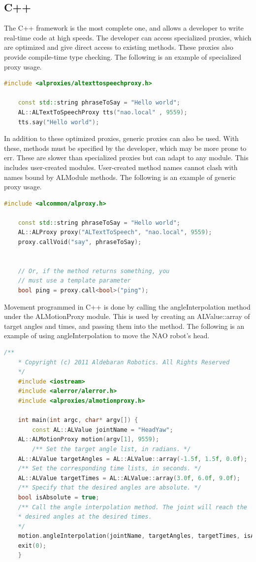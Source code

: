 \documentclass[onecolumn, draftclsnofoot,10pt, compsoc]{IEEEtran}
\begin{document}
\subsection{C++}
The C++ framework is the most complete one, and allows a developer to write real-time code at high speeds.
The developer can access specialized proxies, which are optimized and give direct access to existing methods.
These proxies also provide compile-time type checking.
The following is an example of specialized proxy usage.

\begin{lstlisting}[language=C++]
	#include <alproxies/altexttospeechproxy.h>

	const std::string phraseToSay = "Hello world";
	AL::ALTextToSpeechProxy tts("nao.local" , 9559);
	tts.say("Hello world");
\end{lstlisting}

In addition to these optimized proxies, generic proxies can also be used.
With these, methods must be specified by the developer, which may be more prone to err.
These are slower than specialized proxies but can adapt to any module.
This includes user-created modules. User-created method names cannot clash with names bound by ALModule methods.
The following is an example of generic proxy usage. \cite{NAOSDK:C++}

\begin{lstlisting}[language=C++]
	#include <alcommon/alproxy.h>

	const std::string phraseToSay = "Hello world";
	AL::ALProxy proxy("ALTextToSpeech", "nao.local", 9559);
	proxy.callVoid("say", phraseToSay);


	// Or, if the method returns something, you
	// must use a template parameter
	bool ping = proxy.call<bool>("ping");
\end{lstlisting}

Movement programmed in C++ is done by calling the angleInterpolation method under the ALMotionProxy module.
This is used by creating an ALValue::array of target angles and times, and passing them into the method.
The following is an example of using angleInterpolation to move the NAO robot's head.
\begin{lstlisting}[language=C++]
	/**
	* Copyright (c) 2011 Aldebaran Robotics. All Rights Reserved
	*/
	#include <iostream>
	#include <alerror/alerror.h>
	#include <alproxies/almotionproxy.h>

	int main(int argc, char* argv[]) {
		const AL::ALValue jointName = "HeadYaw";
    AL::ALMotionProxy motion(argv[1], 9559);
	 	/** Set the target angle list, in radians. */
    AL::ALValue targetAngles = AL::ALValue::array(-1.5f, 1.5f, 0.0f);
    /** Set the corresponding time lists, in seconds. */
    AL::ALValue targetTimes = AL::ALValue::array(3.0f, 6.0f, 9.0f);
    /** Specify that the desired angles are absolute. */
    bool isAbsolute = true;
    /** Call the angle interpolation method. The joint will reach the
    * desired angles at the desired times.
    */
    motion.angleInterpolation(jointName, targetAngles, targetTimes, isAbsolute);
  	exit(0);
	}

\end{lstlisting}
\end{document}
